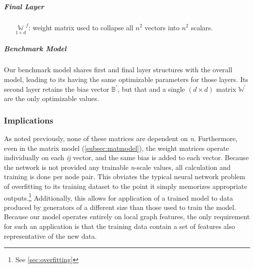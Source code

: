 \subparagraph{Final Layer}
\begin{itemize}
	\item[$\underset{1 \times d}{\mathbb{W}}^f$:] weight matrix used to collapse 
		all $n^2$ vectors into $n^2$ scalars.
\end{itemize}

\subparagraph{Benchmark Model}
Our benchmark model shares first and final layer structures with the overall 
model, leading to its having the same optimizable parameters for those layers.  
Its second layer retains the bias vector $\mathbb{B}^\prime$, but that and a 
single $(d \times d)$ matrix $\mathbb{W}^\prime$ are the only optimizable 
values.


\subsubsection{Implications}
As noted previously, none of these matrices are dependent on \textit{n}.  
Furthermore, even in the matrix model (\ref{subsec:matmodel}), the weight 
matrices operate individually on each \textit{ij} vector, and the same bias is 
added to each vector.  Because the network is not provided any trainable 
\textit{n}-scale values, all calculation and training is done per node pair.  
This obviates the typical neural network problem of overfitting to its training 
dataset to the point it simply memorizes appropriate outputs.\footnote{See 
\ref{sec:overfitting}} Additionally, this allows for application of a trained 
model to data produced by generators of a different size than those used to 
train the model. Because our model operates entirely on local graph features, 
the only requirement for such an application is that the training data contain a 
set of features also representative of the new data.
